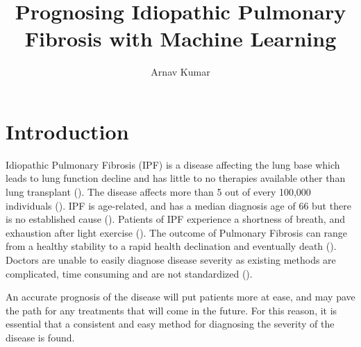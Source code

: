 \documentclass[12pt]{article}
\title{Prognosing Idiopathic Pulmonary Fibrosis with Machine Learning}
\author{Arnav Kumar}
\renewcommand{\maketitle}{
    \begin{center}
        {\large \thetitle}

        \vspace{0.1em}
        {\theauthor}
    \end{center}
}
\begin{document}
\maketitle
\thispagestyle{fancy}

\section{Introduction}


Idiopathic Pulmonary Fibrosis (IPF) is a disease affecting the lung base which leads to lung function decline and has little to no therapies available other than lung transplant (\cite{mason1999pharmacological,gross2001idiopathic}). 
The disease affects more than 5 out of every 100,000 individuals (\cite{coultas1994epidemiology,mason1999pharmacological,raghu2018diagnosis}). 
IPF is age-related, and has a median diagnosis age of 66 but there is no established cause (\cite{king2011idiopathic,raghu2018diagnosis}).
Patients of IPF experience a shortness of breath, and exhaustion after light exercise (\cite{gross2001idiopathic}).
The outcome of Pulmonary Fibrosis can range from a healthy stability to a rapid health declination and eventually death (\cite{robbie2017evaluating}). 
Doctors are unable to easily diagnose disease severity as existing methods are complicated, time consuming and are not standardized (\cite{robbie2017evaluating}). 

An accurate prognosis of the disease will put patients more at ease, and may pave the path for any treatments that will come in the future. 
For this reason, it is essential that a consistent and easy method for diagnosing the severity of the disease is found.

\end{document}
